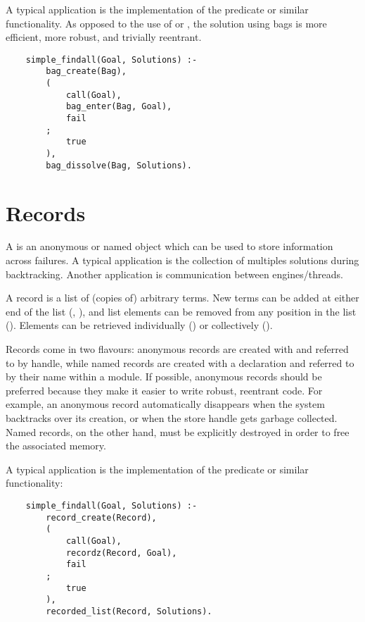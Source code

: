 A typical application is the
implementation of the  predicate or similar functionality.
As opposed to the use of  or , the
solution using
bags is more efficient, more robust, and trivially reentrant.
\begin{verbatim}
    simple_findall(Goal, Solutions) :-
        bag_create(Bag),
        (
            call(Goal),
            bag_enter(Bag, Goal),
            fail
        ;
            true
        ),
        bag_dissolve(Bag, Solutions).
\end{verbatim}


\section{Records}

A  is an anonymous or named object which can be used
to store information across failures.  A typical application is the
collection of multiples solutions during backtracking. Another application
is communication between engines/threads.

A record is a list of (copies of) arbitrary terms.
New terms can be added at either end of the list
(,
),
and list elements can be removed from any position in the list
().
Elements can be retrieved individually
()
or collectively
().

Records come in two flavours:  anonymous records are created with
and referred to by handle, while named records are created with a
declaration and referred to by their name within a module.
If possible, anonymous records should be preferred because they make it
easier to write robust, reentrant code.  For example, an anonymous record
automatically disappears when the system backtracks over its creation,
or when the store handle gets garbage collected.  Named records, on the
other hand, must be explicitly destroyed in order to free the
associated memory.

A typical application is the
implementation of the  predicate or similar functionality:
\begin{verbatim}
    simple_findall(Goal, Solutions) :-
        record_create(Record),
        (
            call(Goal),
            recordz(Record, Goal),
            fail
        ;
            true
        ),
        recorded_list(Record, Solutions).
\end{verbatim}

